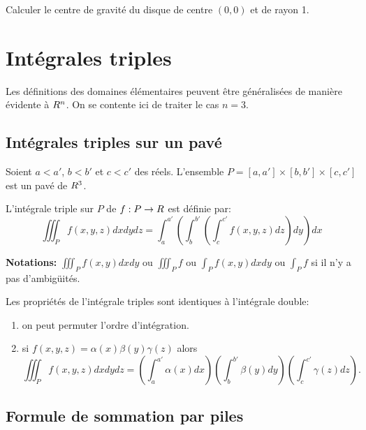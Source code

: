 \begin{exemple}
	Calculer le centre de gravité du disque de centre $(0,0)$ et de rayon 1. 
\pl{\rep{6cm}}
\end{exemple}

\sld{\vfill\pagebreak[5]}%

\section{Intégrales triples}

Les définitions des domaines élémentaires peuvent être généralisées de manière évidente à $R^n$. On se contente ici de traiter le cas $n=3$.

\subsection{Intégrales triples sur un pavé}
\begin{definition}
	Soient $a<a'$, $b<b'$ et $c<c'$ des réels. L'ensemble $P = [a,a'] \times [b,b'] \times [c,c']$ est un pavé de $R^3$.
\end{definition}

\begin{definition}
	L'intégrale triple sur $P$ de $f:P \to R$ est définie par:
	\[
		\iiint_{P} f(x,y,z) dx dy dz = \int_{a}^{a'} \left( \int_{b}^{b'} \left( \int_{c}^{c'} f(x,y,z) dz \right) dy  \right) dx 
	\]
\end{definition}
{\bf\sffamily Notations:} $\iiint_P f(x,y) dx dy$ ou $\iiint_P f  $ ou $\int_P f(x,y) dx dy  $ ou $ \int_P f$ si il n'y a pas d'ambigüités.


\sld{\vfill\pagebreak[5]}%

\begin{remark}
	Les propriétés de l'intégrale triples sont identiques à l'intégrale double:
	\begin{enumerate}
		\item on peut permuter l'ordre d'intégration.
		\item si $f(x,y,z) = \alpha(x)\beta(y)\gamma(z)$ alors 
		$$\iiint_{P} f(x,y,z) dxdydz = \left( \int_{a}^{a'} \alpha(x)dx \right)\left( \int_{b}^{b'} \beta(y) dy \right) \left( \int_{c}^{c'} \gamma(z) dz\right).$$
	\end{enumerate}
\end{remark}

\sld{\vfill\pagebreak[5]}%

\subsection{Formule de sommation par piles}


